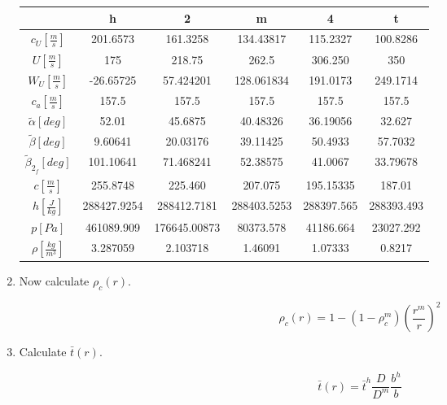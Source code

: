 \documentclass[titlepage]{article}
\begin{document}
\begin{enumerate}
    \begin{center}
        \begin{tabular}{|c|c|c|c|c|c|}
            \hline
            & h & 2 & m & 4 & t \\
            \hline
            $c_{U} [\frac{m}{s}]$ & 201.6573 & 161.3258 & 134.43817 & 115.2327 & 100.8286 \\
            \hline
            $U [\frac{m}{s}]$ & 175 & 218.75 & 262.5 & 306.250 & 350 \\
            \hline
            $W_{U} [\frac{m}{s}]$ & -26.65725 & 57.424201 & 128.061834 & 191.0173 & 249.1714 \\
            \hline
            $c_{a} [\frac{m}{s}]$ & 157.5 & 157.5 & 157.5 & 157.5 & 157.5 \\
            \hline
            $\tilde{\alpha} [deg]$ & 52.01 & 45.6875 & 40.48326 & 36.19056 & 32.627 \\
            \hline
            $\tilde{\beta} [deg]$ & 9.60641 & 20.03176 & 39.11425 & 50.4933 & 57.7032 \\ 
            \hline
            $\tilde{\beta}_{2_{f}} [deg]$ & 101.10641 & 71.468241 & 52.38575 & 41.0067 & 33.79678 \\
            \hline
            $c [\frac{m}{s}]$ & 255.8748 & 225.460 & 207.075 & 195.15335 & 187.01 \\
            \hline
            $h [\frac{J}{kg}]$ & 288427.9254 & 288412.7181 & 288403.5253 & 288397.565 & 288393.493 \\
            \hline
            $p [Pa]$ & 461089.909 & 176645.00873 & 80373.578 & 41186.664 & 23027.292 \\
            \hline
            $\rho [\frac{kg}{m^{3}}]$ & 3.287059 & 2.103718 & 1.46091 & 1.07333 & 0.8217 \\
            \hline
        \end{tabular}
    \end{center}

    \item Now calculate $\rho_{c}(r)$.
    
    \begin{equation}
        \rho_{c}(r) = 1 - (1 - \rho_{c}^{m}) \left(\frac{r^{m}}{r} \right)^{2}
    \end{equation}

    \item Calculate $\bar{t}(r)$.
    
    \begin{equation}
        \bar{t}(r) = \bar{t}^{h} \frac{D}{D^{m}} \frac{b^{h}}{b}
    \end{equation}


\end{enumerate}
\end{document}
